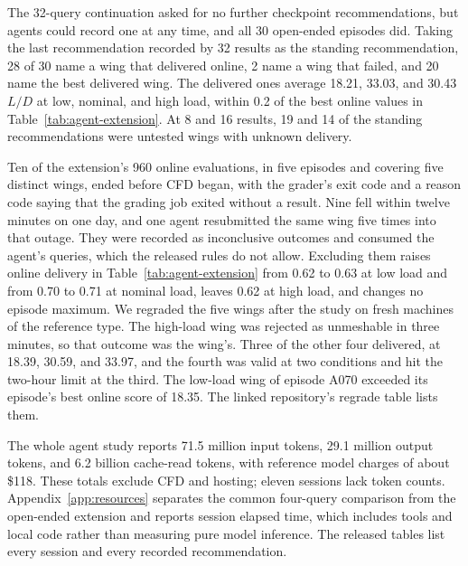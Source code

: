 \documentclass{article} %
\begin{document}
The 32-query continuation asked for no further checkpoint recommendations, but
agents could record one at any time, and all 30 open-ended episodes did.
Taking the last recommendation recorded by 32 results as the standing
recommendation, 28 of 30 name a wing that delivered
online, 2 name a wing that failed, and 20 name the best delivered wing. The
delivered ones average 18.21, 33.03, and 30.43 $L/D$ at low, nominal, and high
load, within 0.2 of the best online values in Table~\ref{tab:agent-extension}.
At 8 and 16 results, 19 and 14 of the standing recommendations were untested
wings with unknown delivery.

Ten of the extension's 960 online evaluations, in five episodes and covering
five distinct wings, ended before CFD began, with the grader's exit code and a
reason code saying that the grading job exited without a result. Nine fell within
twelve minutes on one day, and one agent resubmitted the same wing five times
into that outage. They were recorded as inconclusive outcomes and consumed the
agent's queries, which the released rules do not allow. Excluding them raises
online delivery in Table~\ref{tab:agent-extension} from 0.62 to 0.63 at low
load and from 0.70 to 0.71 at nominal load, leaves 0.62 at high load, and
changes no episode maximum. We regraded the five wings after the study on
fresh machines of the reference type. The high-load wing was rejected as
unmeshable in three minutes, so that outcome was the wing's. Three of the other four delivered, at 18.39, 30.59, and 33.97, and the fourth was valid at two conditions and hit the two-hour limit at the third. The low-load wing of episode A070 exceeded its episode's best online score of 18.35. The linked repository's regrade table lists them.

The whole agent study reports 71.5 million input tokens, 29.1 million output
tokens, and 6.2 billion cache-read tokens, with reference model charges of about
\$118. These totals exclude CFD and hosting; eleven sessions lack token counts.
Appendix~\ref{app:resources} separates the common four-query comparison from
the open-ended extension and reports session elapsed time, which includes
tools and local code rather than measuring pure model inference.
The released tables list every session and every recorded recommendation.
\end{document}
